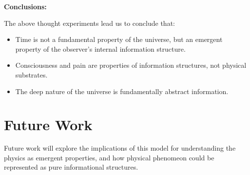 \documentclass[11pt]{article}
\begin{document}
\textbf{Conclusions:}

The above thought experiments lead us to conclude that:
\begin{itemize}
  \item Time is not a fundamental property of the universe, but an emergent property of the observer's internal information structure.
  \item Consciousness and pain are properties of information structures, not physical substrates.
  \item The deep nature of the universe is fundamentally abstract information.
\end{itemize}


\section{Future Work}

Future work will explore the implications of this model for understanding the physics as emergent properties, and how physical phenomeon could be represented as pure informational structures.
\end{document}
